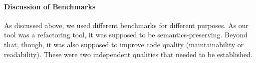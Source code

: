 
\paragraph{Discussion of Benchmarks}
As discussed above, we used different benchmarks for different purposes. As our tool was a refactoring tool, it was supposed to be semantics-preserving. Beyond that, though, it was also supposed to improve code quality (maintainability or readability). These were two independent qualities that needed to be established.

